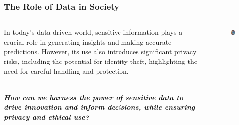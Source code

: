 \documentclass{beamer}
\begin{document}
\begin{frame}
\frametitle{The Role of Data in Society}
\begin{columns}[T] %
    \begin{column}{0.6\textwidth}
        In today's data-driven world, sensitive information plays a crucial role in generating insights and making accurate predictions. However, its use also introduces significant privacy risks, including the potential for identity theft, highlighting the need for careful handling and protection.
        
        \begin{center}
            \textbf{\textit{\\How can we harness the power of sensitive data to drive innovation and inform decisions, while ensuring privacy and ethical use?}}
        \end{center}
        
    \end{column}
    \begin{column}{0.4\textwidth}
        \begin{figure}
            \centering
            \bigskip
            \medskip
            \includegraphics[width=\linewidth]{slide2.png}
        \end{figure}
    \end{column}
\end{columns}
\end{frame}
\end{document}
